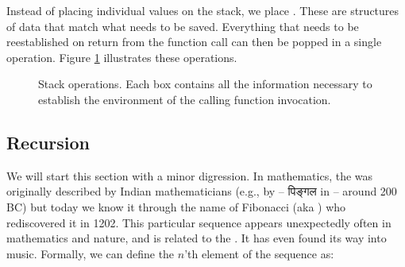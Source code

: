 Instead of placing individual values on the stack, we place . These are structures of data that match what needs to be saved. Everything that needs to be reestablished on return from the function call can then be popped in a single operation. Figure \ref{fig:fun:stack} illustrates these operations.

\begin{figure}[tbp]
  
  \caption[Stack operations.]{Stack operations. Each box contains all the information necessary to establish the environment of the calling function invocation.}
  \label{fig:fun:stack}
\end{figure}


\subsection{Recursion}

We will start this section with a minor digression. In mathematics, the  was originally described by Indian mathematicians (e.g., by  -- पिङ्गल in  -- around 200 BC\cite{towards_a_global_science}) but today we know it through the name of Fibonacci (aka ) who rediscovered it in 1202. This particular sequence appears unexpectedly often in mathematics and nature, and is related to the . It has even found its way into music\cite{tool_lateralus}. Formally, we can define the $n$'th element of the sequence as:

